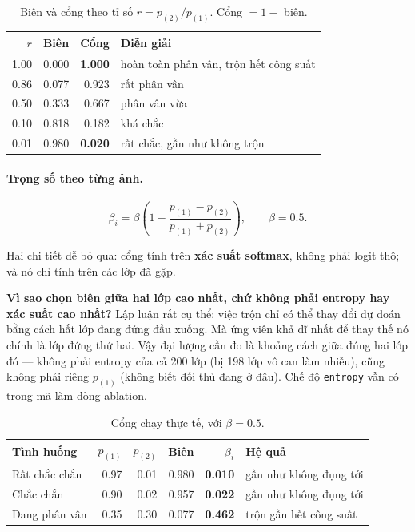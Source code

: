 \documentclass[11pt,a4paper]{article}
\newenvironment{luuy}{\begin{leftbar}\noindent\ignorespaces}{\end{leftbar}}
\begin{document}
\begin{table}[htbp]
\centering
\caption{Biên và cổng theo tỉ số $r = p_{(2)}/p_{(1)}$. Cổng $= 1 -$ biên.}
\label{tab:bien-ti-so}
\begin{tabular}{@{}rrrl@{}}
\toprule
$r$ & Biên & Cổng & Diễn giải \\
\midrule
1.00 & 0.000 & \textbf{1.000} & hoàn toàn phân vân, trộn hết công suất \\
0.86 & 0.077 & 0.923 & rất phân vân \\
0.50 & 0.333 & 0.667 & phân vân vừa \\
0.10 & 0.818 & 0.182 & khá chắc \\
0.01 & 0.980 & \textbf{0.020} & rất chắc, gần như không trộn \\
\bottomrule
\end{tabular}
\end{table}

\paragraph{Trọng số theo từng ảnh.}
\begin{equation}
\beta_i = \beta \left( 1 - \frac{p_{(1)} - p_{(2)}}{p_{(1)} + p_{(2)}} \right),
\qquad \beta = 0.5 .
\label{eq:gate}
\end{equation}

Hai chi tiết dễ bỏ qua: cổng tính trên \textbf{xác suất softmax}, không phải
logit thô; và nó chỉ tính trên các lớp đã gặp.

\begin{luuy}
\textbf{Vì sao chọn biên giữa hai lớp cao nhất, chứ không phải entropy hay xác
suất cao nhất?} Lập luận rất cụ thể: việc trộn chỉ có thể thay đổi dự đoán bằng
cách hất lớp đang đứng đầu xuống. Mà ứng viên khả dĩ nhất để thay thế nó chính là
lớp đứng thứ hai. Vậy đại lượng cần đo là khoảng cách giữa đúng hai lớp đó ---
không phải entropy của cả 200 lớp (bị 198 lớp vô can làm nhiễu), cũng không phải
riêng $p_{(1)}$ (không biết đối thủ đang ở đâu). Chế độ \texttt{entropy} vẫn có
trong mã làm dòng ablation.
\end{luuy}

\begin{table}[htbp]
\centering
\caption{Cổng chạy thực tế, với $\beta = 0.5$.}
\label{tab:gate}
\begin{tabular}{@{}lrrrrl@{}}
\toprule
Tình huống & $p_{(1)}$ & $p_{(2)}$ & Biên & $\beta_i$ & Hệ quả \\
\midrule
Rất chắc chắn   & 0.97 & 0.01 & 0.980 & \textbf{0.010} & gần như không đụng tới \\
Chắc chắn       & 0.90 & 0.02 & 0.957 & \textbf{0.022} & gần như không đụng tới \\
Đang phân vân   & 0.35 & 0.30 & 0.077 & \textbf{0.462} & trộn gần hết công suất \\
\bottomrule
\end{tabular}
\end{table}
\end{document}
